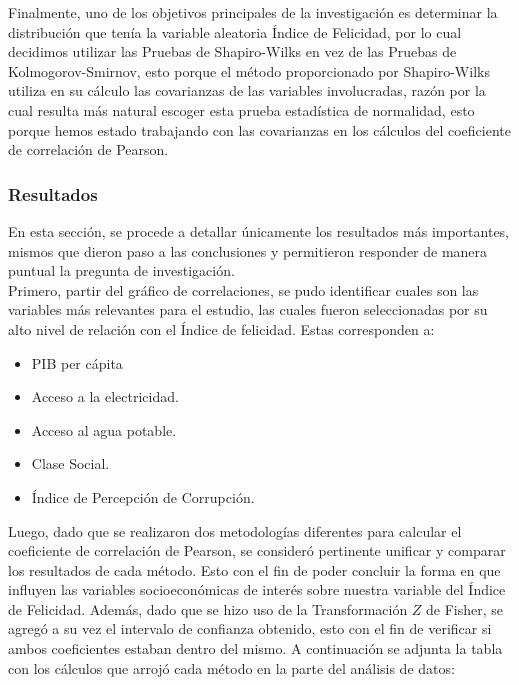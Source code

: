 Finalmente, uno de los objetivos principales de la investigación es determinar la distribución que tenía la variable aleatoria Índice de Felicidad, por lo cual decidimos utilizar las Pruebas de Shapiro-Wilks en vez de las Pruebas de Kolmogorov-Smirnov, esto porque el método proporcionado por Shapiro-Wilks utiliza en su cálculo las covarianzas de las variables involucradas, razón por la cual resulta más natural escoger esta prueba estadística de normalidad, esto porque hemos estado trabajando con las covarianzas en los cálculos del coeficiente de correlación de Pearson. \\

\subsubsection{Resultados}

En esta sección, se procede a detallar únicamente los resultados más importantes, mismos que dieron paso a las conclusiones y permitieron responder de manera puntual la pregunta de investigación. \\

Primero, partir del gráfico de correlaciones, se pudo identificar cuales son las variables más relevantes para el estudio, las cuales fueron seleccionadas por su alto nivel de relación con el Índice de felicidad. Estas corresponden a: 

\begin{itemize}
    \item PIB per cápita
    \item Acceso a la electricidad.
    \item Acceso al agua potable.
    \item Clase Social.
    \item Índice de Percepción de Corrupción. 
\end{itemize}

Luego, dado que se realizaron dos metodologías diferentes para calcular el coeficiente de correlación de Pearson, se consideró pertinente unificar y comparar los resultados de cada método. Esto con el fin de poder concluir la forma en que influyen las variables socioeconómicas de interés sobre nuestra variable del Índice de Felicidad. Además, dado que se hizo uso de la Transformación $Z$ de Fisher, se agregó a su vez el intervalo de confianza obtenido, esto con el fin de verificar si ambos coeficientes estaban dentro del mismo. A continuación se adjunta la tabla con los cálculos que arrojó cada método en la parte del análisis de datos: 

